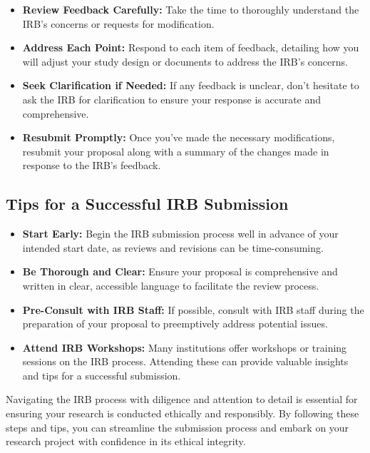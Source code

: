 \documentclass[
]{book}
\providecommand{\tightlist}{%
  \setlength{\itemsep}{0pt}\setlength{\parskip}{0pt}}
\begin{document}
\begin{enumerate}
  \begin{itemize}
  \tightlist
  \item
    \textbf{Review Feedback Carefully:} Take the time to thoroughly understand the IRB's concerns or requests for modification.
  \item
    \textbf{Address Each Point:} Respond to each item of feedback, detailing how you will adjust your study design or documents to address the IRB's concerns.
  \item
    \textbf{Seek Clarification if Needed:} If any feedback is unclear, don't hesitate to ask the IRB for clarification to ensure your response is accurate and comprehensive.
  \item
    \textbf{Resubmit Promptly:} Once you've made the necessary modifications, resubmit your proposal along with a summary of the changes made in response to the IRB's feedback.
  \end{itemize}
\end{enumerate}

\hypertarget{tips-for-a-successful-irb-submission}{%
\subsection*{Tips for a Successful IRB Submission}\label{tips-for-a-successful-irb-submission}}

\begin{itemize}
\tightlist
\item
  \textbf{Start Early:} Begin the IRB submission process well in advance of your intended start date, as reviews and revisions can be time-consuming.
\item
  \textbf{Be Thorough and Clear:} Ensure your proposal is comprehensive and written in clear, accessible language to facilitate the review process.
\item
  \textbf{Pre-Consult with IRB Staff:} If possible, consult with IRB staff during the preparation of your proposal to preemptively address potential issues.
\item
  \textbf{Attend IRB Workshops:} Many institutions offer workshops or training sessions on the IRB process. Attending these can provide valuable insights and tips for a successful submission.
\end{itemize}

Navigating the IRB process with diligence and attention to detail is essential for ensuring your research is conducted ethically and responsibly. By following these steps and tips, you can streamline the submission process and embark on your research project with confidence in its ethical integrity.
\end{document}
